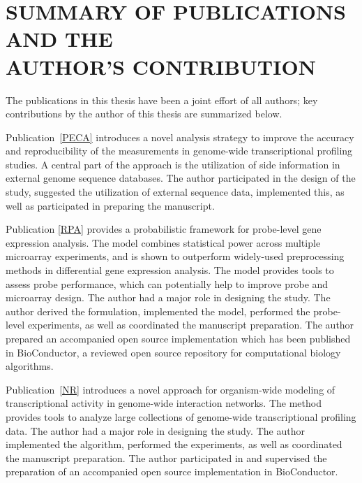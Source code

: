 
\section*{SUMMARY OF PUBLICATIONS AND THE\\ AUTHOR'S CONTRIBUTION}
 

The publications in this thesis have been a joint effort of all
authors; key contributions by the author of this thesis are summarized
below.

Publication~\ref{PECA} introduces a novel analysis strategy to improve
the accuracy and reproducibility of the measurements in genome-wide
transcriptional profiling studies. A central part of the approach is
the utilization of side information in external genome sequence
databases.  The author participated in the design of the study,
suggested the utilization of external sequence data, implemented this,
as well as participated in preparing the manuscript.

Publication \ref{RPA} provides a probabilistic framework for
probe-level gene expression analysis. The model combines statistical
power across multiple microarray experiments, and is shown to
outperform widely-used preprocessing methods in differential gene
expression analysis. The model provides tools to assess probe
performance, which can potentially help to improve probe and
microarray design. The author had a major role in designing the
study. The author derived the formulation, implemented the model,
performed the probe-level experiments, as well as coordinated the
manuscript preparation. The author prepared an accompanied open source
implementation which has been published in BioConductor, a reviewed
open source repository for computational biology algorithms.

Publication~\ref{NR} introduces a novel approach for organism-wide
modeling of transcriptional activity in genome-wide interaction
networks. The method provides tools to analyze large collections of
genome-wide transcriptional profiling data. The author had a major
role in designing the study. The author implemented the algorithm,
performed the experiments, as well as coordinated the manuscript
preparation. The author participated in and supervised the preparation
of an accompanied open source implementation in BioConductor.

